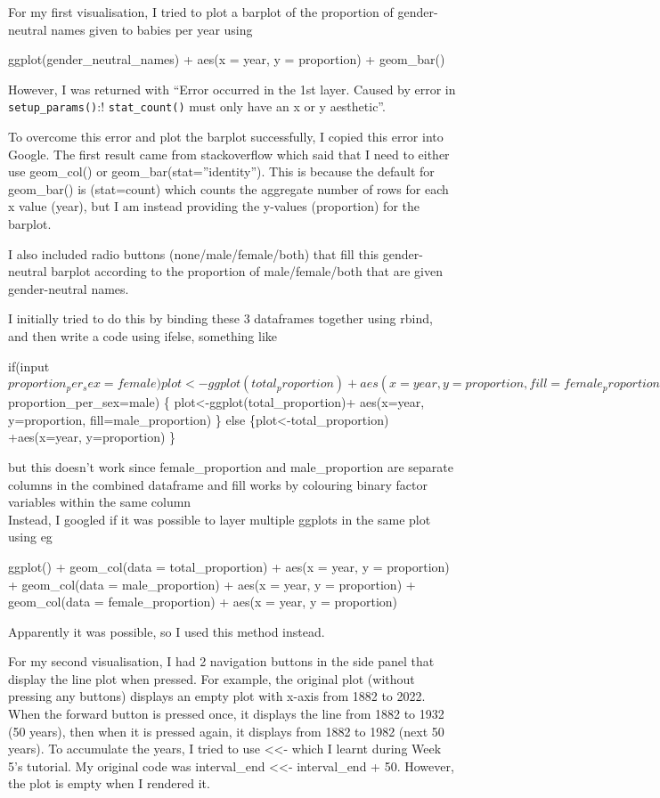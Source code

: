 \documentclass[
]{article}
\begin{document}
For my first visualisation, I tried to plot a barplot of the proportion
of gender-neutral names given to babies per year using

ggplot(gender\_neutral\_names) + aes(x = year, y = proportion) +
geom\_bar()

However, I was returned with ``Error occurred in the 1st layer. Caused
by error in \texttt{setup\_params()}:! \texttt{stat\_count()} must only
have an x or y aesthetic''.

To overcome this error and plot the barplot successfully, I copied this
error into Google. The first result came from stackoverflow which said
that I need to either use geom\_col() or geom\_bar(stat=''identity'').
This is because the default for geom\_bar() is (stat=count) which counts
the aggregate number of rows for each x value (year), but I am instead
providing the y-values (proportion) for the barplot.

I also included radio buttons (none/male/female/both) that fill this
gender-neutral barplot according to the proportion of male/female/both
that are given gender-neutral names.

I initially tried to do this by binding these 3 dataframes together
using rbind, and then write a code using ifelse, something like

if(input\(proportion_per_sex=female) { plot<-ggplot(total_proportion)+ aes(x=year, y=proportion, fill=female_proportion) } else if(input\)proportion\_per\_sex=male)
\{ plot\textless-ggplot(total\_proportion)+ aes(x=year, y=proportion,
fill=male\_proportion) \} else \{plot\textless-total\_proportion)
+aes(x=year, y=proportion) \}

but this doesn't work since female\_proportion and male\_proportion are
separate columns in the combined dataframe and fill works by colouring
binary factor variables within the same column\\
Instead, I googled if it was possible to layer multiple ggplots in the
same plot using eg

ggplot() + geom\_col(data = total\_proportion) + aes(x = year, y =
proportion) + geom\_col(data = male\_proportion) + aes(x = year, y =
proportion) + geom\_col(data = female\_proportion) + aes(x = year, y =
proportion)

Apparently it was possible, so I used this method instead.

For my second visualisation, I had 2 navigation buttons in the side
panel that display the line plot when pressed. For example, the original
plot (without pressing any buttons) displays an empty plot with x-axis
from 1882 to 2022. When the forward button is pressed once, it displays
the line from 1882 to 1932 (50 years), then when it is pressed again, it
displays from 1882 to 1982 (next 50 years). To accumulate the years, I
tried to use \textless\textless- which I learnt during Week 5's
tutorial. My original code was interval\_end \textless\textless-
interval\_end + 50. However, the plot is empty when I rendered it.
\end{document}
